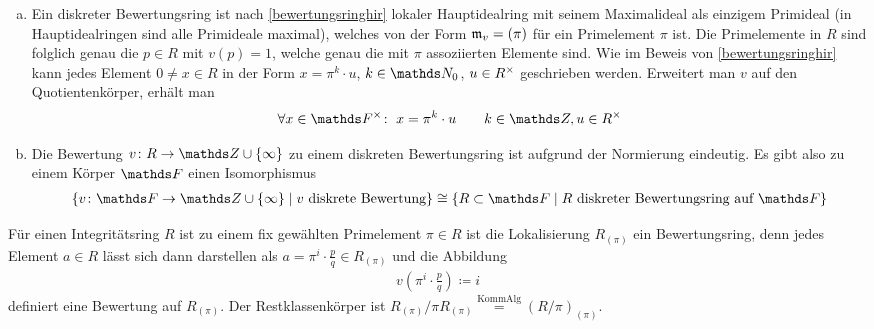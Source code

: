 \documentclass[ngerman,fontsize=11pt, paper=a4, parskip=half, titlepage=true, toc=bib]{scrartcl}
\begin{document}
\begin{Bem}\label{darstellungdbk}
  \begin{enumerate}[a)]
  \item Ein diskreter Bewertungsring ist nach \ref{bewertungsringhir}
    lokaler Hauptidealring mit seinem Maximalideal als einzigem 
    Primideal (in Hauptidealringen sind alle Primideale maximal),
    welches von der Form $\mathfrak{m}_v=(\pi)$ für ein Primelement $\pi$ ist.
    Die Primelemente in $R$ sind folglich genau die $p\in R$ mit $v(p)=1$, 
    welche genau die mit $\pi$ assoziierten Elemente sind.
    Wie im Beweis von \ref{bewertungsringhir} kann jedes Element $0\neq x\in R$
    in der Form $x=\pi^k\cdot u$, $k\in\N_0$, $u\in R^\times$ 
    geschrieben werden.
    Erweitert man $v$ auf den Quotientenkörper, erhält man
    \begin{gather*}
      \forall x\in \Fx\colon\;
      x=\pi^k\cdot u
      \qquad k\in\Z, u\in \Rx
    \end{gather*}
  \item Die Bewertung $v\colon R\to\Z\cup\{\infty\}$ zu einem diskreten
    Bewertungsring ist aufgrund der Normierung eindeutig.
    Es gibt also zu einem Körper $\F$ einen Isomorphismus
    \begin{gather*}
      \{v\colon \F\to\Z\cup\{\infty\} 
      \mid \text{$v$ diskrete Bewertung}\}
      \cong 
      \{R\subset \F\mid \text{$R$ diskreter Bewertungsring auf $\F$}\}
    \end{gather*}
  \end{enumerate}
\end{Bem}

\begin{Bsp}\label{p-adischebewertung}
  Für einen Integritätsring $R$ ist zu einem fix gewählten 
  Primelement $\pi\in R$ ist
  die Lokalisierung $R_{(\pi)}$ ein Bewertungsring, denn jedes Element
  $a\in R$ lässt sich dann darstellen als $a=\pi^i\cdot \frac{p}{q}\in
  R_{(\pi)}$ und die Abbildung
  \begin{gather*}
    v\left(\pi^i\cdot \frac{p}{q}\right)\coloneqq i
  \end{gather*}
  definiert eine Bewertung auf $R_{(\pi)}$.
  Der Restklassenkörper ist 
  $R_{(\pi)}/\pi R_{(\pi)}\overset{\text{KommAlg}}{=}(R/\pi)_{(\pi)}$.
\end{Bsp}
\end{document}
